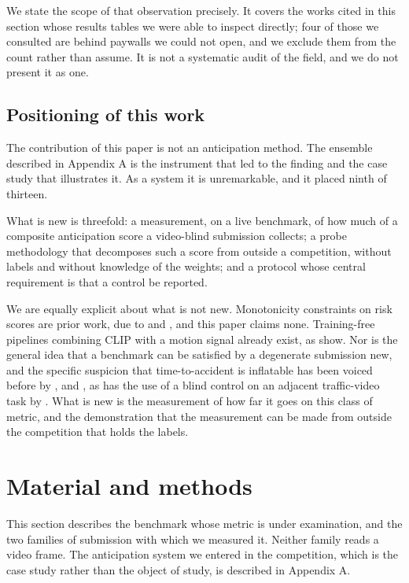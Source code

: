 We state the scope of that observation precisely. It covers the works cited in this section whose results tables we were able to inspect directly; four of those we consulted are behind paywalls we could not open, and we exclude them from the count rather than assume. It is not a systematic audit of the field, and we do not present it as one.

\subsection{Positioning of this work}
The contribution of this paper is not an anticipation method. The ensemble described in Appendix A is the instrument that led to the finding and the case study that illustrates it. As a system it is unremarkable, and it placed ninth of thirteen.

What is new is threefold: a measurement, on a live benchmark, of how much of a composite anticipation score a video-blind submission collects; a probe methodology that decomposes such a score from outside a competition, without labels and without knowledge of the weights; and a protocol whose central requirement is that a control be reported.

We are equally explicit about what is not new. Monotonicity constraints on risk scores are prior work, due to \citet{pjetri2025nondecreasing} and \citet{zou2026riskprop}, and this paper claims none. Training-free pipelines combining CLIP with a motion signal already exist, as \citet{thakur2026modular} show. Nor is the general idea that a benchmark can be satisfied by a degenerate submission new, and the specific suspicion that time-to-accident is inflatable has been voiced before by \citet{zhao2025top}, \citet{goldshmidt2025badas} and \citet{caselli2026flara}, as has the use of a blind control on an adjacent traffic-video task by \citet{korkut2026blind}. What is new is the measurement of how far it goes on this class of metric, and the demonstration that the measurement can be made from outside the competition that holds the labels.


\section{Material and methods}

This section describes the benchmark whose metric is under examination, and the two families of submission with which we measured it. Neither family reads a video frame. The anticipation system we entered in the competition, which is the case study rather than the object of study, is described in Appendix A.

